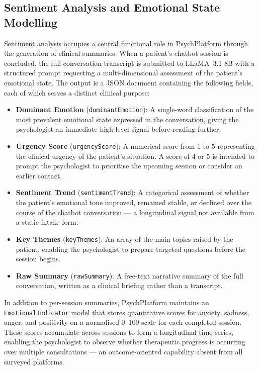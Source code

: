 \documentclass[a4paper,12pt]{report}
\begin{document}
\subsection{Sentiment Analysis and Emotional State Modelling}
\label{subsec:sentiment}

Sentiment analysis occupies a central functional role in PsychPlatform through the generation of clinical summaries. When a patient's chatbot session is concluded, the full conversation transcript is submitted to LLaMA~3.1 8B with a structured prompt requesting a multi-dimensional assessment of the patient's emotional state. The output is a JSON document containing the following fields, each of which serves a distinct clinical purpose:

\begin{itemize}[leftmargin=1.5em, itemsep=4pt]
  \item[--] \textbf{Dominant Emotion} (\texttt{dominantEmotion}): A single-word classification of the most prevalent emotional state expressed in the conversation, giving the psychologist an immediate high-level signal before reading further.
  \item[--] \textbf{Urgency Score} (\texttt{urgencyScore}): A numerical score from 1 to 5 representing the clinical urgency of the patient's situation. A score of 4 or 5 is intended to prompt the psychologist to prioritise the upcoming session or consider an earlier contact.
  \item[--] \textbf{Sentiment Trend} (\texttt{sentimentTrend}): A categorical assessment of whether the patient's emotional tone improved, remained stable, or declined over the course of the chatbot conversation --- a longitudinal signal not available from a static intake form.
  \item[--] \textbf{Key Themes} (\texttt{keyThemes}): An array of the main topics raised by the patient, enabling the psychologist to prepare targeted questions before the session begins.
  \item[--] \textbf{Raw Summary} (\texttt{rawSummary}): A free-text narrative summary of the full conversation, written as a clinical briefing rather than a transcript.
\end{itemize}

In addition to per-session summaries, PsychPlatform maintains an \texttt{EmotionalIndicator} model that stores quantitative scores for anxiety, sadness, anger, and positivity on a normalised 0--100 scale for each completed session. These scores accumulate across sessions to form a longitudinal time series, enabling the psychologist to observe whether therapeutic progress is occurring over multiple consultations --- an outcome-oriented capability absent from all surveyed platforms.
\end{document}
